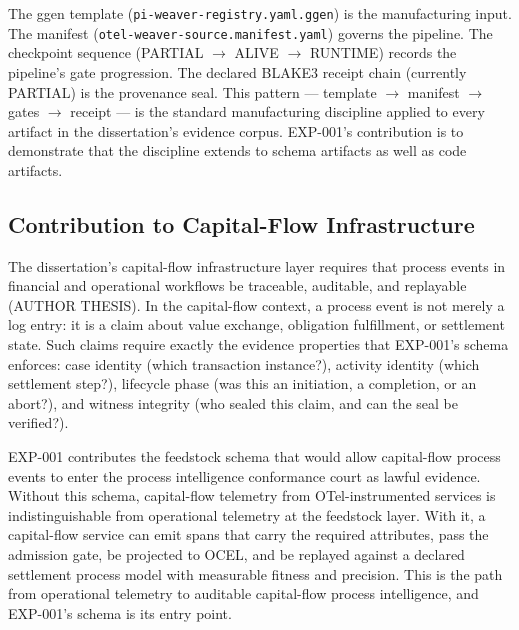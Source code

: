 The ggen template (\texttt{pi-weaver-registry.yaml.ggen}) is the manufacturing input. The
manifest (\texttt{otel-weaver-source.manifest.yaml}) governs the pipeline. The checkpoint
sequence (PARTIAL $\to$ ALIVE $\to$ RUNTIME) records the pipeline's gate progression. The
declared BLAKE3 receipt chain (currently PARTIAL) is the provenance seal. This pattern ---
template $\to$ manifest $\to$ gates $\to$ receipt --- is the standard manufacturing discipline
applied to every artifact in the dissertation's evidence corpus. EXP-001's contribution is to
demonstrate that the discipline extends to schema artifacts as well as code artifacts.

\subsection{Contribution to Capital-Flow Infrastructure}
\label{sec:otel-weaver-exp-001-custom-pi-registry-contribution-capital-flow}

The dissertation's capital-flow infrastructure layer requires that process events in financial
and operational workflows be traceable, auditable, and replayable (AUTHOR THESIS). In the
capital-flow context, a process event is not merely a log entry: it is a claim about value
exchange, obligation fulfillment, or settlement state. Such claims require exactly the evidence
properties that EXP-001's schema enforces: case identity (which transaction instance?), activity
identity (which settlement step?), lifecycle phase (was this an initiation, a completion, or an
abort?), and witness integrity (who sealed this claim, and can the seal be verified?).

EXP-001 contributes the feedstock schema that would allow capital-flow process events to enter
the process intelligence conformance court as lawful evidence. Without this schema, capital-flow
telemetry from OTel-instrumented services is indistinguishable from operational telemetry at the
feedstock layer. With it, a capital-flow service can emit spans that carry the required attributes,
pass the admission gate, be projected to OCEL, and be replayed against a declared settlement
process model with measurable fitness and precision. This is the path from operational telemetry
to auditable capital-flow process intelligence, and EXP-001's schema is its entry point.
